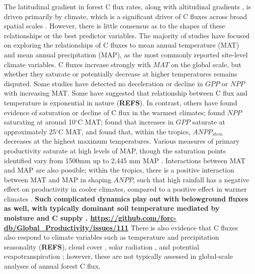 \documentclass[
]{article}
\begin{document}
The latitudinal gradient in forest C flux rates, along with altitudinal
gradients \citep{girardin_net_2010, malhi_variation_2017}, is driven
primarily by climate, which is a significant driver of C fluxes across
broad spatial scales
\citep{luyssaert_co_2007, cleveland_relationships_2011, hursh_sensitivity_2017}.
However, there is little consensus as to the shapes of these
relationships or the best predictor variables. The majority of studies
have focused on exploring the relationships of C fluxes to mean annual
temperature (MAT) and mean annual precipitation (MAP), as the most
commonly reported site-level climate variables. C fluxes increase
strongly with \(MAT\) on the global scale, but whether they saturate or
potentially decrease at higher temperatures remains disputed. Some
studies have detected no deceleration or decline in \(GPP\)
\citep{luyssaert_co_2007} or \(NPP\) \citep{schuur_productivity_2003}
with increasing MAT. Some have suggested that relationship between C
flux and temperature is exponential in nature \citep{allen_linking_2005}
(\textbf{REFS}). In contrast, others have found evidence of saturation
or decline of C flux in the warmest climates; \citet{luyssaert_co_2007}
found \(NPP\) saturating at around 10\(^\circ\)C MAT;
\citet{larjavaara_temperature_2012} found that increases in \(GPP\)
saturate at approximately 25\(^\circ\)C MAT, and
\citet{sullivan_sensitivity_2020} found that, within the tropics,
\(ANPP_{stem}\) decreases at the highest maximum temperatures. Various
measures of primary productivity saturate at high levels of MAP, though
the saturation points identified vary from 1500mm
\citep{luyssaert_co_2007} up to 2,445 mm MAP
\citep{schuur_productivity_2003}. Interactions between MAT and MAP are
also possible; within the tropics, there is a positive interaction
between MAT and MAP in shaping \(ANPP\), such that high rainfall has a
negative effect on productivity in cooler climates, compared to a
positive effect in warmer climates \citep{taylor_temperature_2017}.
\textbf{Such complicated dynamics play out with belowground fluxes as
well, with typically dominant soil temperature mediated by moisture and
C supply \citep{hursh_sensitivity_2017, xu_contribution_2016}.
\url{https://github.com/forc-db/Global_Productivity/issues/111}} There
is also evidence that C fluxes also respond to climate variables such as
temperature and precipitation seasonality (\textbf{REFS}), cloud cover
\citep{taylor_temperature_2017}, solar radiation
\citep{beer_terrestrial_2010, fyllas_solar_2017}, and potential
evapotranspiration \citep{kerkhoff_plant_2005}; however, these are not
typically assessed in global-scale analyses of annual forest C flux.
\end{document}
